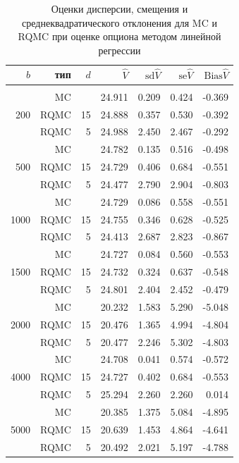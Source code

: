 \documentclass{article}
\newcommand{\Vhat}{\hat{V}}
\begin{document}
\begin{table}[hp]
\centering
\caption{Оценки дисперсии, смещения и среднеквадратического отклонения для MC и RQMC при оценке опциона методом линейной регрессии}\label{tbl:mc_rqmc}
\vspace{10pt}
\begin{tabular}{rrrrrrr}
$b$&тип&$d$&$\Vhat$&$\mathrm{sd}\Vhat$&$\mathrm{se}\Vhat$&$\mathrm{Bias}\Vhat$\\[5pt]\hline\\
&MC&&24.911&0.209&0.424&-0.369\\
200&RQMC&15&24.888&0.357&0.530&-0.392\\
&RQMC&5&24.988&2.450&2.467&-0.292\\[5pt]
&MC&&24.782&0.135&0.516&-0.498\\
500&RQMC&15&24.729&0.406&0.684&-0.551\\
&RQMC&5&24.477&2.790&2.904&-0.803\\[5pt]
&MC&&24.729&0.086&0.558&-0.551\\
1000&RQMC&15&24.755&0.346&0.628&-0.525\\
&RQMC&5&24.413&2.687&2.823&-0.867\\[5pt]
&MC&&24.727&0.084&0.560&-0.553\\
1500&RQMC&15&24.732&0.324&0.637&-0.548\\
&RQMC&5&24.801&2.404&2.452&-0.479\\[5pt]
&MC&&20.232&1.583&5.290&-5.048\\
2000&RQMC&15&20.476&1.365&4.994&-4.804\\
&RQMC&5&20.477&2.246&5.302&-4.803\\[5pt]
&MC&&24.708&0.041&0.574&-0.572\\
4000&RQMC&15&24.727&0.402&0.684&-0.553\\
&RQMC&5&25.294&2.260&2.260&0.014\\[5pt]
&MC&&20.385&1.375&5.084&-4.895\\
5000&RQMC&15&20.639&1.453&4.864&-4.641\\
&RQMC&5&20.492&2.021&5.197&-4.788\\[5pt]
\end{tabular}
\end{table}
\end{document}
